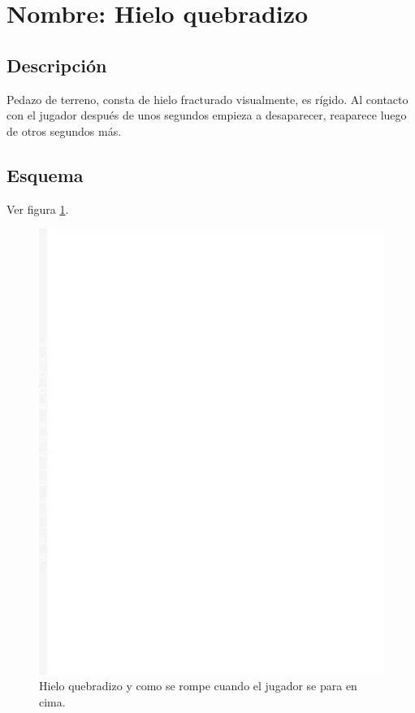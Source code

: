 		\section{Nombre: Hielo quebradizo}\label{obs.hieloQ}
	\subsection{Descripción}
	Pedazo de terreno, consta de hielo fracturado visualmente, es rígido. Al contacto con el jugador después de unos segundos empieza a desaparecer, reaparece luego de otros segundos más.
	\subsection{Esquema}
	Ver figura \ref{fig:hieloQ}.
	\begin{figure}
		\centering
		\includegraphics[height=0.2 \textheight]{Imagenes/hieloQ}
		\caption{Hielo quebradizo y como se rompe cuando el jugador se para en cima.}
		\label{fig:hieloQ}
	\end{figure}